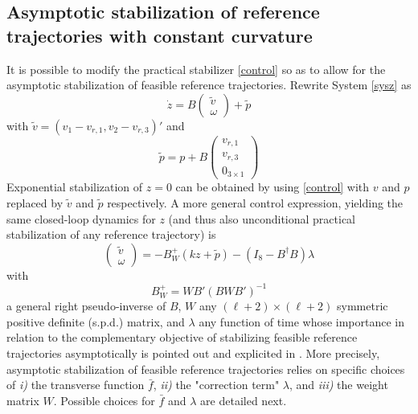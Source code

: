 \documentclass[a4paper,twoside]{article}
\begin{document}
\subsection{Asymptotic stabilization of reference trajectories with constant curvature}
It is possible to modify the practical stabilizer \eqref{control} so as to allow for the asymptotic 
stabilization of feasible reference trajectories. Rewrite System \eqref{sysz} as
\begin{equation}
\label{sysz2}
\dot{z}=B \begin{pmatrix} \tilde v \\ \omega \end{pmatrix} + \tilde p
\end{equation}
with $\tilde v= (v_1 -v_{r,1}, v_2 -v_{r,3})'$ and
\[
\tilde p = p + B \begin{pmatrix}
v_{r,1} \\
v_{r,3} \\
0_{3\times 1}
\end{pmatrix}
\]
Exponential stabilization of $z=0$ can be obtained by using \eqref{control} with $v$ and $p$ replaced by
$\tilde v$ and $\tilde p$ respectively.  A more general control expression, yielding
the same closed-loop dynamics for $z$ (and thus also unconditional practical stabilization of any reference 
trajectory) is
\begin{equation} 
\label{control2}
\begin{pmatrix} \tilde v \\ \omega \end{pmatrix}= -B_W^+ (k z+ \tilde p) - (I_{8} - B^{\dagger} B) \lambda
\end{equation}
with
\begin{equation}
\label{defBP}
B_W^+= W B'(B W B')^{-1}
\end{equation}
a general right pseudo-inverse of $B$, $W$ any $(\ell+2) \times (\ell+2)$ symmetric positive definite (s.p.d.) matrix, and $\lambda$ 
any function of time whose importance in relation to the complementary objective of stabilizing feasible reference 
trajectories asymptotically is pointed out and explicited in \cite{ms11}. More precisely,
asymptotic stabilization of feasible reference trajectories 
relies on specific choices of {\it i)} the transverse function $\bar f$, {\it ii)} the "correction term" 
$\lambda$, and {\it iii)} the weight matrix $W$. Possible choices for $\bar f$ and $\lambda$ are detailed next.
\end{document}
